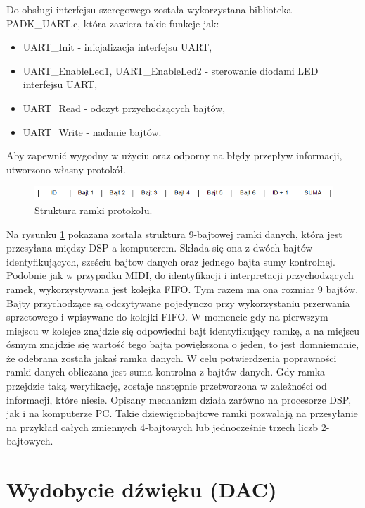 Do obsługi interfejsu szeregowego została wykorzystana biblioteka PADK\_UART.c, która zawiera takie funkcje jak:
\begin{itemize}
	\item UART\_Init - inicjalizacja interfejsu UART,
	\item UART\_EnableLed1, UART\_EnableLed2 - sterowanie diodami LED interfejsu UART,
	\item UART\_Read - odczyt przychodzących bajtów,
	\item UART\_Write - nadanie bajtów.
\end{itemize}
Aby zapewnić wygodny w użyciu oraz odporny na błędy przepływ informacji, utworzono własny protokół.
\begin{figure}[H]
	\centering
	\includegraphics[width=16cm]{./grafiki/real_uartframe}
	\captionsetup{justification=centering}
	\caption{Struktura ramki protokołu.}
	\label{rys:real_uartframe}
\end{figure}
Na rysunku \ref{rys:real_uartframe} pokazana została struktura 9-bajtowej ramki danych, która jest przesyłana między DSP a komputerem. Składa się ona z dwóch bajtów identyfikujących, sześciu bajtow danych oraz jednego bajta sumy kontrolnej. Podobnie jak w przypadku MIDI, do identyfikacji i interpretacji przychodzących ramek, wykorzystywana jest kolejka FIFO. Tym razem ma ona rozmiar 9 bajtów. Bajty przychodzące są odczytywane pojedynczo przy wykorzystaniu przerwania sprzetowego i wpisywane do kolejki FIFO. W momencie gdy na pierwszym miejscu w kolejce znajdzie się odpowiedni bajt identyfikujący ramkę, a na miejscu ósmym znajdzie się wartość tego bajta powiększona o jeden, to jest domniemanie, że odebrana została jakaś ramka danych. W celu potwierdzenia poprawności ramki danych   obliczana jest suma kontrolna z bajtów danych. Gdy ramka przejdzie taką weryfikację, zostaje następnie przetworzona w zależności od informacji, które niesie. Opisany mechanizm działa zarówno na procesorze DSP, jak i na komputerze PC.
Takie dziewięciobajtowe ramki pozwalają na przesyłanie na przykład całych zmiennych 4-bajtowych lub jednocześnie trzech liczb 2-bajtowych. 



\section{Wydobycie dźwięku (DAC)}

